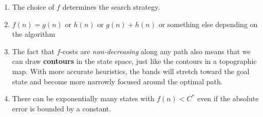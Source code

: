 \begin{enumerate}[itemsep=0.2cm]
\begin{enumerate}[itemsep=0.2cm]
        \item The choice of $f$ determines the search strategy.
        \hfill \cite{ai/book/Artificial-Intelligence-A-Modern-Approach/Russell-Norvig}

        \item $f(n) = g(n)$ or $h(n)$ or $g(n)+h(n)$ or something else depending on the algorithm

        \item The fact that $f$-costs are \textit{non-decreasing} along any path also means that we can draw \textbf{contours} in the state space, just like the contours in a topographic map. 
        With more accurate heuristics, the bands will stretch toward the goal state and become more narrowly focused around the optimal path.
        \hfill \cite{ai/book/Artificial-Intelligence-A-Modern-Approach/Russell-Norvig}

        \item There can be exponentially many states with $f(n) < C^\ast$ even if the absolute error is bounded by a constant.
        \hfill \cite{ai/book/Artificial-Intelligence-A-Modern-Approach/Russell-Norvig}

        
    \end{enumerate}
\end{enumerate}






















\clearpage


